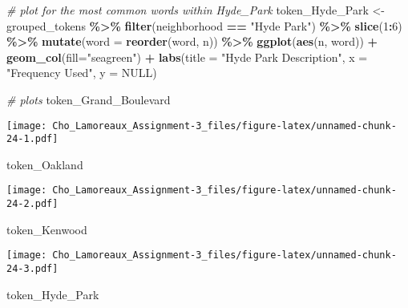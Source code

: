 \documentclass[
]{article}
\newenvironment{Shaded}{\begin{snugshade}}{\end{snugshade}}
\newcommand{\AttributeTok}[1]{\textcolor[rgb]{0.13,0.29,0.53}{#1}}
\newcommand{\CommentTok}[1]{\textcolor[rgb]{0.56,0.35,0.01}{\textit{#1}}}
\newcommand{\ConstantTok}[1]{\textcolor[rgb]{0.56,0.35,0.01}{#1}}
\newcommand{\DecValTok}[1]{\textcolor[rgb]{0.00,0.00,0.81}{#1}}
\newcommand{\FunctionTok}[1]{\textcolor[rgb]{0.13,0.29,0.53}{\textbf{#1}}}
\newcommand{\NormalTok}[1]{#1}
\newcommand{\OtherTok}[1]{\textcolor[rgb]{0.56,0.35,0.01}{#1}}
\newcommand{\SpecialCharTok}[1]{\textcolor[rgb]{0.81,0.36,0.00}{\textbf{#1}}}
\newcommand{\StringTok}[1]{\textcolor[rgb]{0.31,0.60,0.02}{#1}}
\begin{document}
\begin{Shaded}
\begin{Highlighting}[]
\CommentTok{\# plot for the most common words within Hyde\_Park}
\NormalTok{token\_Hyde\_Park }\OtherTok{\textless{}{-}}\NormalTok{ grouped\_tokens }\SpecialCharTok{\%\textgreater{}\%}
  \FunctionTok{filter}\NormalTok{(neighborhood }\SpecialCharTok{==} \StringTok{"Hyde Park"}\NormalTok{) }\SpecialCharTok{\%\textgreater{}\%}
  \FunctionTok{slice}\NormalTok{(}\DecValTok{1}\SpecialCharTok{:}\DecValTok{6}\NormalTok{) }\SpecialCharTok{\%\textgreater{}\%}
  \FunctionTok{mutate}\NormalTok{(}\AttributeTok{word =} \FunctionTok{reorder}\NormalTok{(word, n)) }\SpecialCharTok{\%\textgreater{}\%}
  \FunctionTok{ggplot}\NormalTok{(}\FunctionTok{aes}\NormalTok{(n, word)) }\SpecialCharTok{+}
  \FunctionTok{geom\_col}\NormalTok{(}\AttributeTok{fill=}\StringTok{"seagreen"}\NormalTok{) }\SpecialCharTok{+}
  \FunctionTok{labs}\NormalTok{(}\AttributeTok{title =} \StringTok{"Hyde Park Description"}\NormalTok{, }\AttributeTok{x =} \StringTok{"Frequency Used"}\NormalTok{, }\AttributeTok{y =} \ConstantTok{NULL}\NormalTok{)}
\end{Highlighting}
\end{Shaded}

\begin{Shaded}
\begin{Highlighting}[]
\CommentTok{\# plots}
\NormalTok{token\_Grand\_Boulevard}
\end{Highlighting}
\end{Shaded}

\texttt{[image: Cho\_Lamoreaux\_Assignment-3\_files/figure-latex/unnamed-chunk-24-1.pdf]}

\begin{Shaded}
\begin{Highlighting}[]
\NormalTok{token\_Oakland}
\end{Highlighting}
\end{Shaded}

\texttt{[image: Cho\_Lamoreaux\_Assignment-3\_files/figure-latex/unnamed-chunk-24-2.pdf]}

\begin{Shaded}
\begin{Highlighting}[]
\NormalTok{token\_Kenwood}
\end{Highlighting}
\end{Shaded}

\texttt{[image: Cho\_Lamoreaux\_Assignment-3\_files/figure-latex/unnamed-chunk-24-3.pdf]}

\begin{Shaded}
\begin{Highlighting}[]
\NormalTok{token\_Hyde\_Park}
\end{Highlighting}
\end{Shaded}
\end{document}
